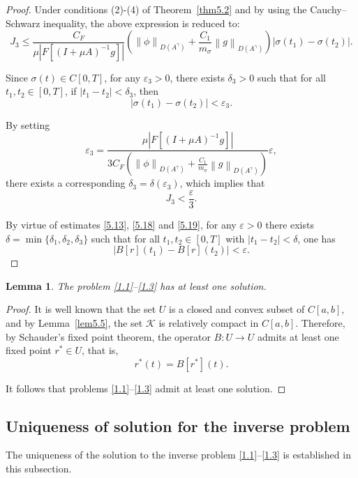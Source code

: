 \documentclass[reqno]{amsart}
\newtheorem{lem}[thm]{Lemma}
\theoremstyle{definition}
\numberwithin{equation}{section}
\begin{document}
\begin{proof}
Under conditions (2)-(4) of Theorem~\ref{thm5.2} and by using the Cauchy–Schwarz inequality, the above expression is reduced to:
$$
{{J}_{3}}\le \frac{{{C}_{F}}}{\mu \left| F[{{(I+\mu A)}^{-1}}g] \right|}\left( {{\left\| \phi  \right\|}_{D(A^{\gamma })}}+\frac{{{C}_{1}}}{{{m}_{\sigma }}}{{\left\| g \right\|}_{D(A^{\gamma })}} \right)\left| \sigma \left( {{t}_{1}} \right)-\sigma \left( {{t}_{2}} \right) \right|.
$$

Since $\sigma(t) \in C[0,T]$, for any $\varepsilon_3>0$, there exists $\delta_3>0$ such that for all $t_1, t_2 \in [0,T]$, if $|t_1 - t_2| < \delta_3$, then
$$
\left| \sigma \left( {{t}_{1}} \right)-\sigma \left( {{t}_{2}} \right) \right|<\varepsilon_3.
$$

By setting 
$$
{{\varepsilon }_{3}}=\frac{\mu \left| F[{{(I+\mu A)}^{-1}}g] \right|}{3{{C}_{F}}\left( {{\left\| \phi  \right\|}_{D(A^{\gamma })}}+\frac{{{C}_{1}}}{{{m}_{\sigma }}}{{\left\| g \right\|}_{D(A^{\gamma })}} \right)}\varepsilon ,
$$
there exists a corresponding $\delta_3=\delta(\varepsilon_3)$, which implies that 
\begin{equation}\label{5.19}
   J_3 <\frac{\varepsilon}{3}. 
\end{equation}

By virtue of estimates \eqref{5.13}, \eqref{5.18} and \eqref{5.19}, for any $\varepsilon>0$ there exists $\delta = \min\{\delta_1,\delta_2,\delta_3\}$ such that for all $t_1,t_2\in[0,T]$ with $|t_1-t_2|<\delta$, one has
$$
\left|B[r]\left(t_1\right)-B[r]\left(t_2\right)\right| < \varepsilon.
$$

\end{proof}

\begin{lem} \label{lem5.6} The problem \eqref{1.1}--\eqref{1.3} has at least one solution.
\end{lem}
\begin{proof} 
It is well known that the set $U$ is a closed and convex subset of $C[a,b]$, and by Lemma~\ref{lem5.5}, the set $\mathcal{K}$ is relatively compact in $C[a,b]$. Therefore, by Schauder’s fixed point theorem, the operator $B: U \to U$ admits at least one fixed point $r^* \in U$, that is,
$$
r^*(t) = B[r^*](t).
$$

It follows that problems \eqref{1.1}–\eqref{1.3} admit at least one solution.

\end{proof}

\subsection{Uniqueness of solution for the inverse problem}  The uniqueness of the solution to the inverse problem \eqref{1.1}–\eqref{1.3} is established in this subsection.
\end{document}
